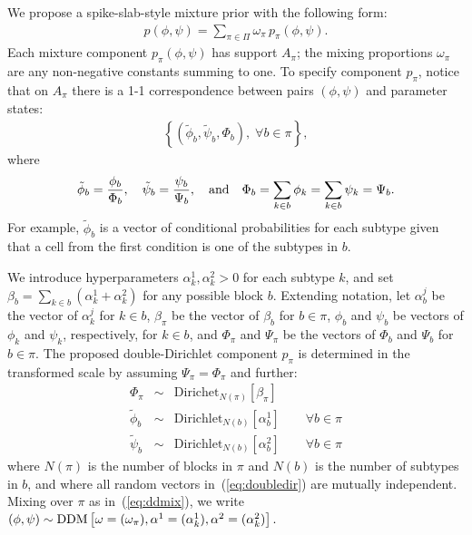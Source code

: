 \documentclass[aoas,preprint]{imsart}
\begin{document}
We propose a spike-slab-style mixture prior with the following form:
\begin{eqnarray}
\label{eq:ddmix}
p(\phi,\psi) = \sum_{\pi \in \Pi} \omega_\pi  \, p_\pi(\phi,\psi ).
\end{eqnarray} 
Each mixture component $p_\pi(\phi,\psi)$ has support $A_\pi$;  
the mixing proportions $\omega_\pi$ are any non-negative constants summing to one. 
To specify component $p_\pi$,  notice that on $A_\pi$ there is a 1-1 correspondence between pairs $(\phi, \psi)$ and 
parameter states:
\begin{eqnarray}
\label{eq:onetoone}
 \left\{ (\tilde \phi_b, \tilde \psi_b, \Phi_b), \; \forall b \in \pi \right\}, 
\end{eqnarray}
where
\begin{eqnarray*}
\tilde{\phi}_b = \frac{\phi_b}{\Phi_b}, \quad \tilde{\psi}_b = \frac{\psi_b}{\Psi_b}, \quad 
{\mbox {\rm and}} \quad \Phi_b = \sum_{k \in b} \phi_k = \sum_{k \in b} \psi_k = \Psi_b.
\end{eqnarray*}
For example, $\tilde{\phi}_b$ is a vector of conditional probabilities for each subtype given that a cell
from the first condition is one of the subtypes in $b$. 


We introduce hyperparameters
$\alpha^1_k, \alpha^2_k>0$ for each subtype $k$, and set 
$\beta_b = \sum_{k \in b}\left( \alpha^1_k + \alpha^2_k \right)$ for any possible block $b$.
Extending notation, let $\alpha_b^j$ be the vector of $\alpha_k^j$
for $k\in b$, $\beta_\pi$ be the vector of $\beta_b$ for $b \in \pi$, $\phi_b$ and $\psi_b$ be vectors
of $\phi_k$ and $\psi_k$, respectively, for $k\in b$, and $\Phi_\pi$ and $\Psi_\pi$ be the vectors
of $\Phi_b$ and $\Psi_b$ for $b \in \pi$.  The proposed double-Dirichlet component 
$p_\pi$ is determined in the transformed scale by assuming $\Psi_\pi = \Phi_\pi$ and further:
\begin{eqnarray}
\label{eq:doubledir}
\Phi_\pi  &\sim& \text{Dirichet}_{N(\pi)}[   \beta_\pi   ]  \\ \nonumber
\tilde \phi_b  &\sim & \text{Dirichlet}_{N(b)}[ \alpha_b^1 ] \qquad \forall b \in \pi \\ \nonumber
\tilde \psi_b  &\sim & \text{Dirichlet}_{N(b)}[ \alpha_b^2 ] \qquad \forall b \in \pi 
\end{eqnarray}
where $N(\pi)$ is the number of blocks in $\pi$ and $N(b)$ is the number of subtypes in $b$, and
where all random vectors in~(\ref{eq:doubledir}) are mutually independent.  
Mixing over $\pi$ as in~(\ref{eq:ddmix}), we write
$(\phi,\psi) \sim {\mbox {\rm DDM}}\left[ \omega=(\omega_\pi),
\alpha^1=(\alpha^1_k), \alpha^2 = (\alpha^2_k) \right].$
\end{document}
